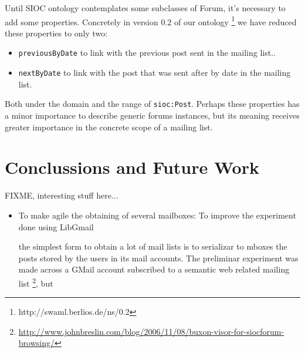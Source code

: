 \documentclass{llncs}
\begin{document}
Until SIOC ontology contemplates some subclasses of Forum, it's necessary 
to add some properties. Concretely in version 0.2 of our ontology 
\footnote{http://swaml.berlios.de/ns/0.2} we have reduced these properties 
to only two:

\begin{itemize}
  \item \texttt{previousByDate} to link with the previous post sent in the 
	mailing list..
  \item \texttt{nextByDate} to link with the post that was sent after by date 
	in the mailing list.
\end{itemize}

Both under the domain and the range of \texttt{sioc:Post}. Perhaps these 
properties has a minor importance to describe generic forums instances, 
but its meaning receives greater importance in the concrete scope of a 
mailing list.

\section{Conclussions and Future Work}

FIXME, interesting stuff here...

\begin{itemize}
  \item To make agile the obtaining of several mailboxes:
	To improve the experiment done using LibGmail
	
	the simplest form to obtain a lot of mail lists is to serializar to mboxes 
	the posts stored by the users in its mail accounts. The preliminar experiment 
	was made across a GMail account subscribed to a semantic web related mailing list
	\footnote{\url{http://www.johnbreslin.com/blog/2006/11/08/buxon-visor-for-siocforum-browsing/}},
	but 
\end{itemize}





%
\end{document}
